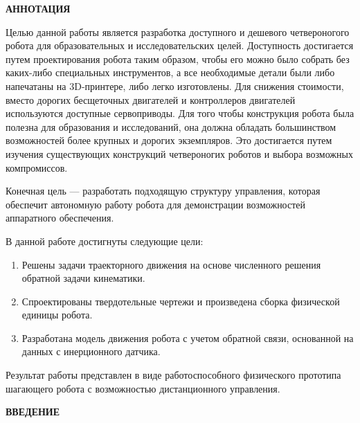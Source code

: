 
\newpage
\begin{center}
	\textbf{АННОТАЦИЯ} 
\end{center}

Целью данной работы является разработка доступного и дешевого четвероногого робота для образовательных и исследовательских целей. Доступность достигается путем проектирования робота таким образом, чтобы его можно было собрать без каких-либо специальных инструментов, а все необходимые детали были либо напечатаны на 3D-принтере, либо легко изготовлены. Для снижения стоимости, вместо дорогих бесщеточных двигателей и контроллеров двигателей используются доступные сервоприводы. Для того чтобы конструкция робота была полезна для образования и исследований, она должна обладать большинством возможностей более крупных и дорогих экземпляров. Это достигается путем изучения существующих конструкций четвероногих роботов и выбора возможных компромиссов.

Конечная цель --- разработать подходящую структуру управления, которая обеспечит автономную работу робота для демонстрации возможностей аппаратного обеспечения.

В данной работе достигнуты следующие цели:
\begin{enumerate} 
	\item Решены задачи траекторного движения на основе численного решения обратной задачи кинематики.
	\item Спроектированы твердотельные чертежи и произведена сборка физической единицы робота.
	\item Разработана модель движения робота с учетом обратной связи, основанной на данных с инерционного датчика.
\end{enumerate}
Результат работы представлен в виде работоспособного физического прототипа шагающего робота с возможностью дистанционного управления.


\onehalfspacing
\setcounter{page}{2}
\renewcommand{\contentsname}{\centerline{\Large{Cодержание}}}
\tableofcontents
{}
\renewcommand{\contentsname}{\centerline{\Large{Cодержание}}}

\newpage
\begin{center}
	\textbf{ВВЕДЕНИЕ}
\end{center}

